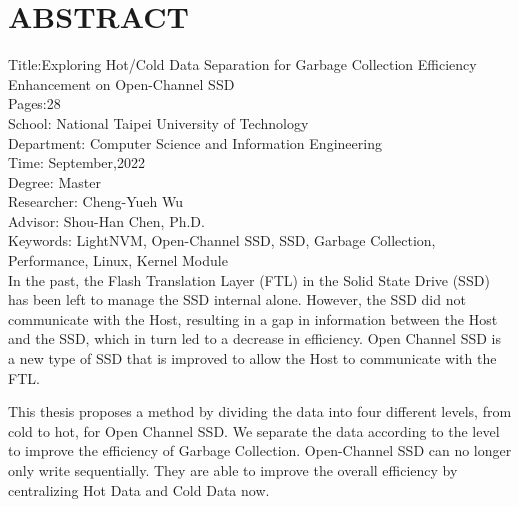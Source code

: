 \chapter*{ABSTRACT}


\noindent
Title:Exploring Hot/Cold Data Separation for Garbage Collection Efficiency Enhancement on Open-Channel SSD\\
Pages:28\\
School: National Taipei University of Technology\\
Department: Computer Science and Information Engineering\\
Time: September,2022\\
Degree: Master\\
Researcher: Cheng-Yueh Wu\\
Advisor: Shou-Han Chen, Ph.D.\\
Keywords: LightNVM, Open-Channel SSD, SSD, Garbage Collection, Performance, Linux, Kernel Module\\
\indent
In the past, the Flash Translation Layer (FTL) in the Solid State Drive (SSD) has been left to manage the SSD internal alone. However, the SSD did not communicate with the Host, resulting in a gap in information between the Host and the SSD, which in turn led to a decrease in efficiency. Open Channel SSD is a new type of SSD that is improved to allow the Host to communicate with the FTL.

\indent
This thesis proposes a method by dividing the data into four different levels, from cold to hot, for Open Channel SSD. We separate the data according to the level to improve the efficiency of Garbage Collection. Open-Channel SSD can no longer only write sequentially. They are able to improve the overall efficiency by centralizing Hot Data and Cold Data now.


